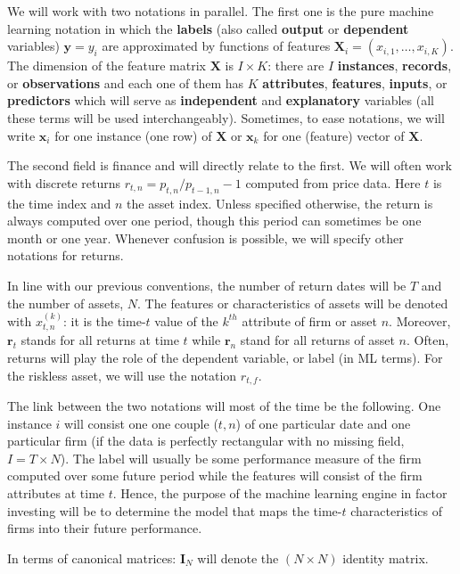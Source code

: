 \documentclass[]{krantz}
\theoremstyle{definition}
\theoremstyle{definition}
\theoremstyle{definition}
\theoremstyle{remark}
\begin{document}
We will work with two notations in parallel. The first one is the pure
machine learning notation in which the \textbf{labels} (also called
\textbf{output} or \textbf{dependent} variables) \(\mathbf{y}=y_i\) are
approximated by functions of features
\(\mathbf{X}_i=(x_{i,1},\dots,x_{i,K})\). The dimension of the feature
matrix \(\mathbf{X}\) is \(I\times K\): there are \(I\)
\textbf{instances}, \textbf{records}, or \textbf{observations} and each
one of them has \(K\) \textbf{attributes}, \textbf{features},
\textbf{inputs}, or \textbf{predictors} which will serve as
\textbf{independent} and \textbf{explanatory} variables (all these terms
will be used interchangeably). Sometimes, to ease notations, we will
write \(\textbf{x}_i\) for one instance (one row) of \(\textbf{X}\) or
\(\textbf{x}_k\) for one (feature) vector of \(\textbf{X}\).

The second field is finance and will directly relate to the first. We
will often work with discrete returns \(r_{t,n}=p_{t,n}/p_{t-1,n}-1\)
computed from price data. Here \(t\) is the time index and \(n\) the
asset index. Unless specified otherwise, the return is always computed
over one period, though this period can sometimes be one month or one
year. Whenever confusion is possible, we will specify other notations
for returns.

In line with our previous conventions, the number of return dates will
be \(T\) and the number of assets, \(N\). The features or
characteristics of assets will be denoted with \(x_{t,n}^{(k)}\): it is
the time-\(t\) value of the \(k^{th}\) attribute of firm or asset \(n\).
Moreover, \(\mathbf{r}_t\) stands for all returns at time \(t\) while
\(\mathbf{r}_n\) stand for all returns of asset \(n\). Often, returns
will play the role of the dependent variable, or label (in ML terms).
For the riskless asset, we will use the notation \(r_{t,f}\).

The link between the two notations will most of the time be the
following. One instance \(i\) will consist one one couple (\(t,n\)) of
one particular date and one particular firm (if the data is perfectly
rectangular with no missing field, \(I=T\times N\)). The label will
usually be some performance measure of the firm computed over some
future period while the features will consist of the firm attributes at
time \(t\). Hence, the purpose of the machine learning engine in factor
investing will be to determine the model that maps the time-\(t\)
characteristics of firms into their future performance.

In terms of canonical matrices: \(\mathbf{I}_N\) will denote the
\((N\times N)\) identity matrix.
\end{document}
